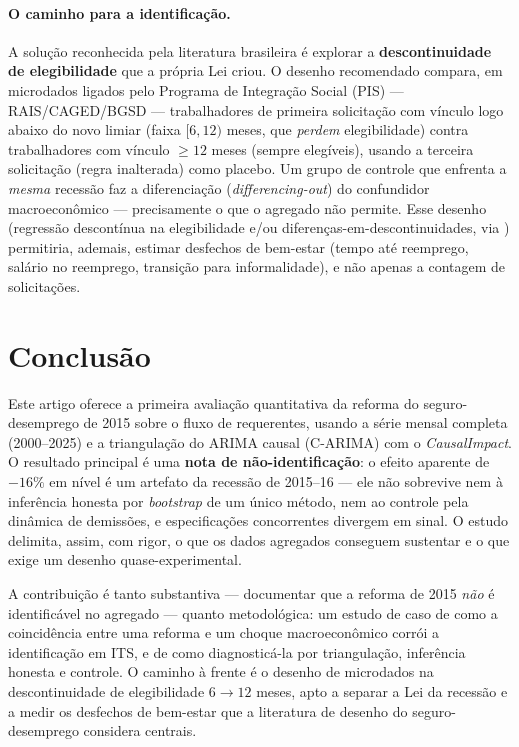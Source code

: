 \documentclass[12pt,a4paper]{article}
\begin{document}
\paragraph{O caminho para a identificação.} A solução reconhecida pela literatura brasileira \citep{brittopinottisampaio2022crime,gerardgonzaga2021informal} é explorar a \textbf{descontinuidade de elegibilidade} que a própria Lei criou. O desenho recomendado compara, em microdados ligados pelo Programa de Integração Social (PIS) --- RAIS/CAGED/BGSD --- trabalhadores de primeira solicitação com vínculo logo abaixo do novo limiar (faixa $[6,12)$ meses, que \textit{perdem} elegibilidade) contra trabalhadores com vínculo $\geq 12$ meses (sempre elegíveis), usando a terceira solicitação (regra inalterada) como placebo. Um grupo de controle que enfrenta a \textit{mesma} recessão faz a diferenciação (\textit{differencing-out}) do confundidor macroeconômico --- precisamente o que o agregado não permite. Esse desenho (regressão descontínua na elegibilidade e/ou diferenças-em-descontinuidades, via \citealp{calonico2014robust,leelemieux2010rdd,callawaysantanna2021did}) permitiria, ademais, estimar desfechos de bem-estar (tempo até reemprego, salário no reemprego, transição para informalidade), e não apenas a contagem de solicitações.

\section{Conclusão}

Este artigo oferece a primeira avaliação quantitativa da reforma do seguro-desemprego de 2015 sobre o fluxo de requerentes, usando a série mensal completa (2000--2025) e a triangulação do ARIMA causal (C-ARIMA) com o \textit{CausalImpact}. O resultado principal é uma \textbf{nota de não-identificação}: o efeito aparente de $-16\%$ em nível é um artefato da recessão de 2015--16 --- ele não sobrevive nem à inferência honesta por \textit{bootstrap} de um único método, nem ao controle pela dinâmica de demissões, e especificações concorrentes divergem em sinal. O estudo delimita, assim, com rigor, o que os dados agregados conseguem sustentar e o que exige um desenho quase-experimental.

A contribuição é tanto substantiva --- documentar que a reforma de 2015 \textit{não} é identificável no agregado --- quanto metodológica: um estudo de caso de como a coincidência entre uma reforma e um choque macroeconômico corrói a identificação em ITS, e de como diagnosticá-la por triangulação, inferência honesta e controle. O caminho à frente é o desenho de microdados na descontinuidade de elegibilidade $6\to12$ meses, apto a separar a Lei da recessão e a medir os desfechos de bem-estar que a literatura de desenho do seguro-desemprego considera centrais.


\end{document}
